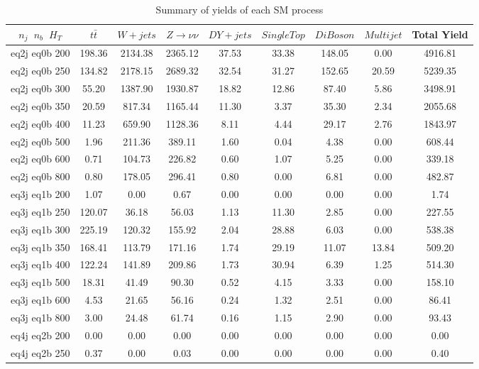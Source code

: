 \begin{longtable}{| c | c | c | c | c | c | c | c | c  | }
\caption{Summary of yields of each SM process} \label{tab:yieldSM-signal} \\    \hline 
$n_{j}$~$n_{b}$~$H_{T}$ & $t\bar{t}$ & $W+jets$ & $Z \rightarrow \nu\nu$ & $DY+jets$ & $Single Top$ & $DiBoson$ & $Multijet$ & Total Yield\\ \hline 
eq2j eq0b 200 & 198.36 & 2134.38 & 2365.12 & 37.53 & 33.38 & 148.05 & 0.00 & 4916.81\\ \hline 
eq2j eq0b 250 & 134.82 & 2178.15 & 2689.32 & 32.54 & 31.27 & 152.65 & 20.59 & 5239.35\\ \hline 
eq2j eq0b 300 & 55.20 & 1387.90 & 1930.87 & 18.82 & 12.86 & 87.40 & 5.86 & 3498.91\\ \hline 
eq2j eq0b 350 & 20.59 & 817.34 & 1165.44 & 11.30 & 3.37 & 35.30 & 2.34 & 2055.68\\ \hline 
eq2j eq0b 400 & 11.23 & 659.90 & 1128.36 & 8.11 & 4.44 & 29.17 & 2.76 & 1843.97\\ \hline 
eq2j eq0b 500 & 1.96 & 211.36 & 389.11 & 1.60 & 0.04 & 4.38 & 0.00 & 608.44\\ \hline 
eq2j eq0b 600 & 0.71 & 104.73 & 226.82 & 0.60 & 1.07 & 5.25 & 0.00 & 339.18\\ \hline 
eq2j eq0b 800 & 0.80 & 178.05 & 296.41 & 0.80 & 0.00 & 6.81 & 0.00 & 482.87\\ \hline 
eq3j eq1b 200 & 1.07 & 0.00 & 0.67 & 0.00 & 0.00 & 0.00 & 0.00 & 1.74\\ \hline 
eq3j eq1b 250 & 120.07 & 36.18 & 56.03 & 1.13 & 11.30 & 2.85 & 0.00 & 227.55\\ \hline 
eq3j eq1b 300 & 225.19 & 120.32 & 155.92 & 2.04 & 28.88 & 6.03 & 0.00 & 538.38\\ \hline 
eq3j eq1b 350 & 168.41 & 113.79 & 171.16 & 1.74 & 29.19 & 11.07 & 13.84 & 509.20\\ \hline 
eq3j eq1b 400 & 122.24 & 141.89 & 209.86 & 1.73 & 30.94 & 6.39 & 1.25 & 514.30\\ \hline 
eq3j eq1b 500 & 18.31 & 41.49 & 90.30 & 0.52 & 4.15 & 3.33 & 0.00 & 158.10\\ \hline 
eq3j eq1b 600 & 4.53 & 21.65 & 56.16 & 0.24 & 1.32 & 2.51 & 0.00 & 86.41\\ \hline 
eq3j eq1b 800 & 3.00 & 24.48 & 61.74 & 0.16 & 1.15 & 2.90 & 0.00 & 93.43\\ \hline 
eq4j eq2b 200 & 0.00 & 0.00 & 0.00 & 0.00 & 0.00 & 0.00 & 0.00 & 0.00\\ \hline 
eq4j eq2b 250 & 0.37 & 0.00 & 0.03 & 0.00 & 0.00 & 0.00 & 0.00 & 0.40\\ \hline 

\end{longtable}
